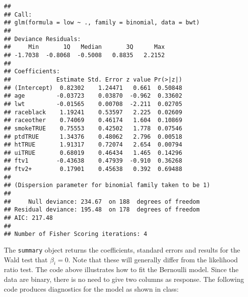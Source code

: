 \documentclass[]{book}
\theoremstyle{definition}
\theoremstyle{definition}
\theoremstyle{definition}
\theoremstyle{remark}
\begin{document}
\begin{verbatim}
## 
## Call:
## glm(formula = low ~ ., family = binomial, data = bwt)
## 
## Deviance Residuals: 
##     Min       1Q   Median       3Q      Max  
## -1.7038  -0.8068  -0.5008   0.8835   2.2152  
## 
## Coefficients:
##             Estimate Std. Error z value Pr(>|z|)
## (Intercept)  0.82302    1.24471   0.661  0.50848
## age         -0.03723    0.03870  -0.962  0.33602
## lwt         -0.01565    0.00708  -2.211  0.02705
## raceblack    1.19241    0.53597   2.225  0.02609
## raceother    0.74069    0.46174   1.604  0.10869
## smokeTRUE    0.75553    0.42502   1.778  0.07546
## ptdTRUE      1.34376    0.48062   2.796  0.00518
## htTRUE       1.91317    0.72074   2.654  0.00794
## uiTRUE       0.68019    0.46434   1.465  0.14296
## ftv1        -0.43638    0.47939  -0.910  0.36268
## ftv2+        0.17901    0.45638   0.392  0.69488
## 
## (Dispersion parameter for binomial family taken to be 1)
## 
##     Null deviance: 234.67  on 188  degrees of freedom
## Residual deviance: 195.48  on 178  degrees of freedom
## AIC: 217.48
## 
## Number of Fisher Scoring iterations: 4
\end{verbatim}

The \texttt{summary} object returns the coefficients, standard errors and results for the Wald test that \(\beta_i=0\). Note that these will generally differ from the likelihood ratio test.
The code above illustrates how to fit the Bernoulli model. Since the data are binary, there is no need to give two columns as response. The following code produces diagnostics for the model as shown in class:
\end{document}
